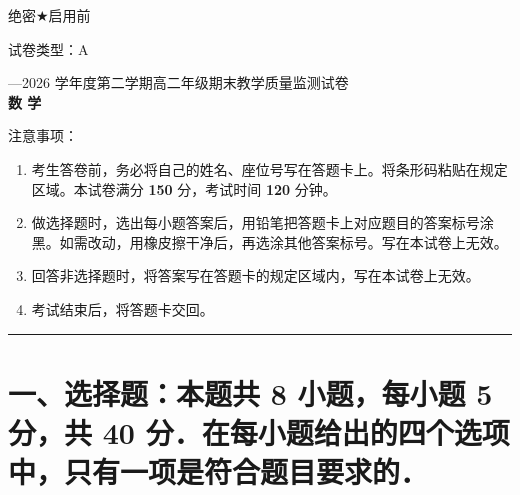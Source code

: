 \documentclass[a4paper,12pt]{ctexart}
\begin{document}

\thispagestyle{firstpage}

\begin{minipage}[t]{0.48\textwidth}
  \heiti 绝密$\bigstar$启用前
\end{minipage}
\hfill
\begin{minipage}[t]{0.48\textwidth}
  \raggedleft{}\heiti 试卷类型：A
\end{minipage}

\vspace{0.3cm}

\begin{center}
{---2026 学年度第二学期高二年级期末教学质量监测试卷}\\[0.4em]
{\heiti\bfseries 数 \quad 学}
\end{center}

\vspace{0.3cm}

{\heiti{} 注意事项：}
\begin{enumerate}[label=\arabic*.,leftmargin=2em,itemsep=1pt,topsep=2pt]
  \item 考生答卷前，务必将自己的姓名、座位号写在答题卡上。将条形码粘贴在规定区域。本试卷满分 \textbf{150} 分，考试时间 \textbf{120} 分钟。
  \item 做选择题时，选出每小题答案后，用铅笔把答题卡上对应题目的答案标号涂黑。如需改动，用橡皮擦干净后，再选涂其他答案标号。写在本试卷上无效。
  \item 回答非选择题时，将答案写在答题卡的规定区域内，写在本试卷上无效。
  \item 考试结束后，将答题卡交回。
\end{enumerate}

\vspace{0.2cm}
{\small\noindent\rule{\textwidth}{0.4pt}}

\section*{一、选择题：本题共 8 小题，每小题 5 分，共 40 分．在每小题给出的四个选项中，只有一项是符合题目要求的．}
\end{document}
